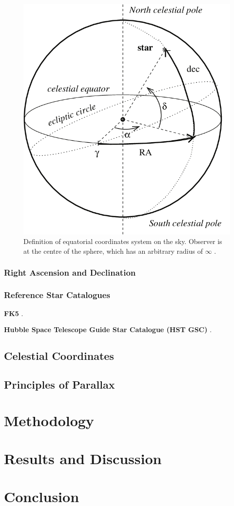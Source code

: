 \documentclass[12pt]{article}
\begin{document}
\begin{figure}[H]
    \centering
    \includegraphics[width=.5\textwidth]{equatorial coords.png}
    \caption{Definition of equatorial coordinates system on the sky. Observer is at the centre of the sphere, which has an arbitrary radius of $\infty$ \protect\cite{equatorialcoords}.}
    \label{fig:1}
\end{figure}

\subsubsection{Right Ascension and Declination}



\subsubsection{Reference Star Catalogues}

\textbf{FK5} \cite{warren1990fifth}.

\textbf{Hubble Space Telescope Guide Star Catalogue (HST GSC)} \cite{hstgsc}.

\subsection{Celestial Coordinates}



\subsection{Principles of Parallax}






\section{Methodology} \label{sec:2}



\section{Results and Discussion} \label{sec:3}



\section{Conclusion} \label{sec:4}



\newpage



 \label{sec:ref}

\vspace{1.5cm}

\listoffigures
\end{document}
